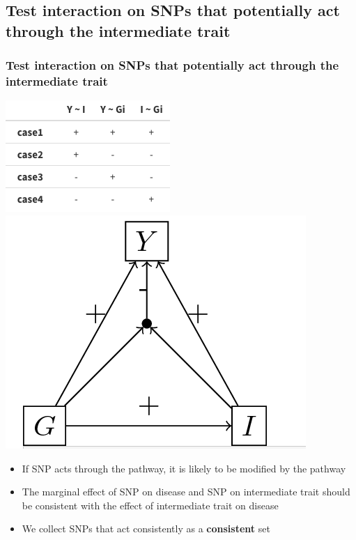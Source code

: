 \documentclass{beamer}
\begin{document}
  \subsection{Test interaction on SNPs that potentially act through the intermediate trait}
  \begin{frame}
  \frametitle{Test interaction on SNPs that potentially act through the intermediate trait}
    \centering
    \includegraphics[width=.45\linewidth]{consistent}
    \label{fig:consistent}
    \hfill
    \includegraphics[width=.45\linewidth]{example}
    \label{fig:example}
    \begin{itemize}
      \item If SNP acts through the pathway, it is likely to be modified by the pathway
      \item The marginal effect of SNP on disease and SNP on intermediate trait should be consistent with the effect of intermediate trait on disease
      \item We collect SNPs that act consistently as a \textbf{consistent} set
    \end{itemize}
  \end{frame}
\end{document}
